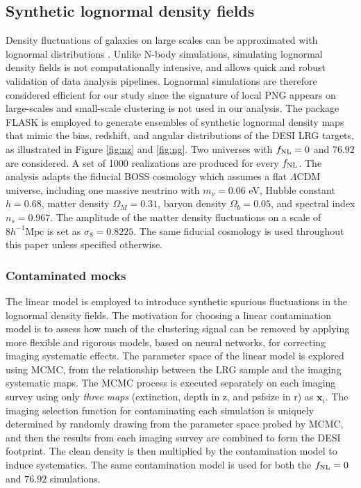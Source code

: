 \subsection{Synthetic lognormal density fields}\label{ssec:mocks}
Density fluctuations of galaxies on large scales can be approximated with lognormal distributions \citep{coles1991}. Unlike N-body simulations, simulating lognormal density fields is not computationally intensive, and allows quick and robust validation of data analysis pipelines. Lognormal simulations are therefore considered efficient for our study since the signature of local PNG appears on large-scales and small-scale clustering is not used in our analysis. The package \textsc{FLASK} \citep[Full-sky Lognormal Astro-fields Simulation Kit;][]{Xavier_2016} is employed to generate ensembles of synthetic lognormal density maps that mimic the bias, redshift, and angular distributions of the DESI LRG targets, as illustrated in Figure \ref{fig:nz} and \ref{fig:ng}. Two universes with $f_{\rm NL}=0$ and $76.92$ are considered. A set of 1000 realizations are produced for every $f_{\rm NL}$. The analysis adapts the fiducial BOSS cosmology \citep{2017MNRAS.470.2617A} which assumes a flat $\Lambda$CDM universe, including one massive neutrino with $m_{\nu}=0.06$ eV, Hubble constant $h = 0.68$, matter density $\Omega_{M}=0.31$, baryon density $\Omega_{b}=0.05$, and spectral index $n_{s}=0.967$. The amplitude of the matter density fluctuations on a scale of $8 h^{-1} \text{Mpc}$ is set as $\sigma_{8}=0.8225$. The same fiducial cosmology is used throughout this paper unless specified otherwise. 

\subsubsection{Contaminated mocks}
The linear model is employed to introduce synthetic spurious fluctuations in the lognormal density fields. The motivation for choosing a linear contamination model is to assess how much of the clustering signal can be removed by applying more flexible and rigorous models, based on neural networks, for correcting imaging systematic effects. The parameter space of the linear model is explored using MCMC, from the relationship between the LRG sample and the imaging systematic maps. The MCMC process is executed separately on each imaging survey using only \textit{three maps} (extinction, depth in z, and psfsize in r) as $\textbf{x}_{i}$. The imaging selection function for contaminating each simulation is uniquely determined by randomly drawing from the parameter space probed by MCMC, and then the results from each imaging survey are combined to form the DESI footprint. The clean density is then multiplied by the contamination model to induce systematics.  The same contamination model is used for both the $f_{\rm NL}=0$ and $76.92$ simulations.

